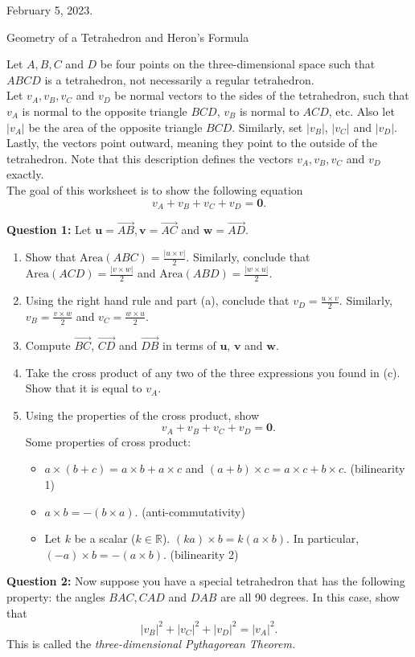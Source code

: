 February 5, 2023.

\vspace{2in}

Geometry of a Tetrahedron and Heron's Formula

Let $A,B,C$ and $D$ be four points on the three-dimensional space such that $ABCD$ is a tetrahedron, not necessarily a regular tetrahedron. \\

Let  $v_A, v_B, v_C$ and $v_D$ be normal vectors to the sides of the tetrahedron, such that $v_A$ is normal to the opposite triangle $BCD$, $v_B$ is normal to $ACD$, etc. Also let $|v_A|$ be the area of the opposite triangle $BCD$. Similarly, set $|v_B|$, $|v_C|$ and $|v_D|$. Lastly, the vectors point outward, meaning they point to the outside of the tetrahedron. Note that this description defines the vectors $v_A, v_B, v_C$ and $v_D$ exactly.\\

The goal of this worksheet is to show the following equation $$v_A+v_B+v_C+v_D = \textbf{0}.$$

\textbf{Question 1:} Let $\textbf{u} = \overset{\rightarrow}{AB}, \textbf{v} = \overset{\rightarrow}{AC}$ and $\textbf{w} = \overset{\rightarrow}{AD}.$ 
\begin{enumerate}[label=(\alph*)]
    \item Show that $\textrm{Area}(ABC) = \frac{|u\times v|}{2}$. Similarly, conclude that $\textrm{Area}(ACD) = \frac{|v\times w|}{2}$ and $\textrm{Area}(ABD) = \frac{|w\times u|}{2}$.
    \item Using the right hand rule and part (a), conclude that $v_D = \frac{u\times v}{2}$. Similarly, $v_B = \frac{v\times w}{2}$ and $v_C = \frac{w\times u}{2}$.
    \item Compute $\overset{\rightarrow}{BC}$, $\overset{\rightarrow}{CD}$ and $\overset{\rightarrow}{DB}$ in terms of $\textbf{u}$, $\textbf{v}$ and $\textbf{w}$.
    \item Take the cross product of any two of the three expressions you found in (c). Show that it is equal to $v_A.$
    \item Using the properties of the cross product, show $$v_A + v_B + v_C + v_D = \textbf{0}.$$ Some properties of cross product:
    \begin{itemize}
        \item $a\times (b+c) = a\times b + a\times c$ and $(a+b) \times c = a\times c + b\times c.$ (bilinearity 1) 
        \item $a\times b = - (b\times a).$ (anti-commutativity)
        \item Let $k$ be a scalar ($k\in \mathbb{R}$). $(ka) \times b = k(a\times b).$ In particular, $(-a)\times b = -(a\times b).$ (bilinearity 2)
    \end{itemize}
\end{enumerate}

\textbf{Question 2:} Now suppose you have a special tetrahedron that has the following property: the angles $BAC, CAD$ and $DAB$ are all 90 degrees. In this case, show that $$|v_B|^2+|v_C|^2+|v_D|^2 = |v_A|^2.$$ This is called the \textit{three-dimensional Pythagorean Theorem.}